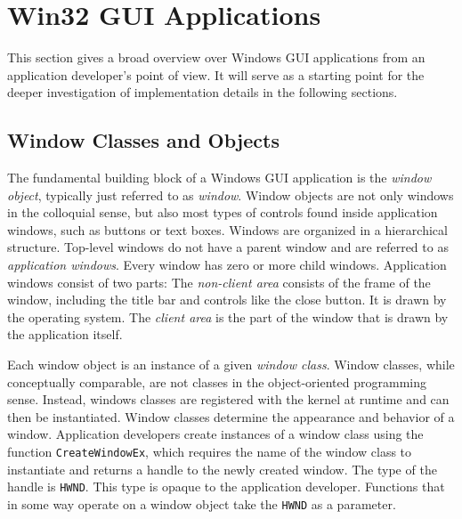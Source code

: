 	\section{Win32 GUI Applications}\label{sec:win32gui}
		This section gives a broad overview over Windows GUI applications from an
		application developer's point of view. It will serve as a starting point
		for the deeper investigation of implementation details in the following
		sections.

		\subsection{Window Classes and Objects}
			The fundamental building block of a Windows GUI application is the
			\textit{window object}, typically just referred to as \textit{window}.
			Window objects are not only windows in the colloquial sense, but also
			most types of controls found inside application windows, such as buttons
			or text boxes. Windows are organized in a hierarchical structure.
			Top-level windows do not have a parent window and are referred to as
			\textit{application windows}. Every window has zero or more child
			windows. Application windows consist of two parts: The \textit{non-client
			area} consists of the frame of the window, including the title bar and
			controls like the close button. It is drawn by the operating system.
			The \textit{client area} is the part of the window that is drawn by
			the application itself.
			\cite{whatiswindow}

			Each window object is an instance of a given \textit{window class}.
			Window classes, while conceptually comparable, are not classes in
			the object-oriented programming sense. Instead, windows classes are
			registered with the kernel at runtime and can then be instantiated.
			Window classes determine the appearance and behavior of a window.
			Application developers create instances of a window class
			using the function
			\texttt{CreateWindowEx}, which requires the name of the window class
			to instantiate and returns a handle to the newly created window.
			The type of the handle is \texttt{HWND}. This type is opaque to the
			application developer. Functions that in some way operate on a
			window object take the \texttt{HWND} as a parameter.
			\cite{creatingwindow,whatiswindow}

